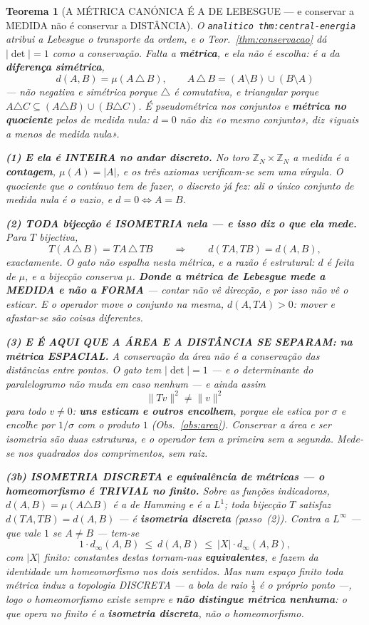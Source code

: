 \documentclass[11pt,a4paper]{article}
\newtheorem{teorema}{Teorema}
\newcommand{\code}[1]{\texttt{\small #1}}
\newcommand{\abs}[1]{\lvert #1\rvert}
\newcommand{\norm}[1]{\lVert #1\rVert}
\begin{document}
\begin{teorema}[A MÉTRICA CANÓNICA É A DE LEBESGUE --- e conservar a MEDIDA não é
conservar a DISTÂNCIA]\label{thm:metrica}
O \code{analitico thm:central-energia} atribui a Lebesgue o \emph{transporte da ordem}, e o
Teor.~\ref{thm:conservacao} dá $\abs{\det}=1$ como a conservação. Falta a \textbf{métrica},
e ela não é escolha: é a da \textbf{diferença simétrica},
\[
\boxed{\;d(A,B)=\mu(A\,\triangle\,B),\qquad A\,\triangle\,B=(A\setminus B)\cup(B\setminus A)\;}
\]
--- não negativa e simétrica porque $\triangle$ é comutativa, e triangular porque
$A\triangle C\subseteq(A\triangle B)\cup(B\triangle C)$. É \emph{pseudo}métrica nos
conjuntos e \textbf{métrica no quociente} pelos de medida nula: $d=0$ não diz «o mesmo
conjunto», diz «iguais a menos de medida nula».

\textbf{(1) E ela é INTEIRA no andar discreto.} No toro $\mathbb{Z}_N\times\mathbb{Z}_N$ a
medida é a \textbf{contagem}, $\mu(A)=\abs{A}$, e os três axiomas verificam-se sem uma
vírgula. \emph{O quociente que o contínuo tem de fazer, o discreto já fez}: ali o único
conjunto de medida nula é o vazio, e $d=0\iff A=B$.

\textbf{(2) TODA bijecção é ISOMETRIA nela --- e isso diz o que ela mede.} Para $T$
bijectiva,
\[
T(A\,\triangle\,B)=TA\,\triangle\,TB \qquad\Longrightarrow\qquad d(TA,TB)=d(A,B),
\]
\emph{exactamente}. O gato não espalha nesta métrica, e a razão é estrutural: $d$ é feita
de $\mu$, e a bijecção conserva $\mu$. \textbf{Donde a métrica de Lebesgue mede a MEDIDA e
não a FORMA} --- contar não vê direcção, e por isso não vê o esticar. E o operador
\emph{move} o conjunto na mesma, $d(A,TA)>0$: \emph{mover e afastar-se são coisas
diferentes}.

\textbf{(3) E É AQUI QUE A ÁREA E A DISTÂNCIA SE SEPARAM: na métrica ESPACIAL.} A
conservação da área não é a conservação das distâncias \emph{entre pontos}. O gato tem
$\abs{\det}=1$ --- e o determinante do paralelogramo não muda em caso nenhum --- e ainda
assim
\[
\norm{Tv}^{2}\neq\norm{v}^{2}
\]
para todo $v\neq0$: \textbf{uns esticam e outros encolhem}, porque ele estica por $\sigma$
e encolhe por $1/\sigma$ com o produto $1$ (Obs.~\ref{obs:area}). \emph{Conservar a área e
ser isometria são duas estruturas, e o operador tem a primeira sem a segunda.} Mede-se nos
quadrados dos comprimentos, sem raiz.

\textbf{(3b) ISOMETRIA DISCRETA e equivalência de métricas --- o homeomorfismo é TRIVIAL
no finito.} Sobre as funções indicadoras, $d(A,B)=\mu(A\triangle B)$ \emph{é} a de
Hamming e \emph{é} a $L^{1}$; toda bijecção $T$ satisfaz $d(TA,TB)=d(A,B)$ --- é
\textbf{isometria discreta} (passo~(2)). Contra a $L^{\infty}$ --- que vale $1$ se
$A\neq B$ --- tem-se
\[
1\cdot d_{\infty}(A,B)\ \leq\ d(A,B)\ \leq\ \abs{X}\cdot d_{\infty}(A,B),
\]
com $\abs{X}$ finito: constantes destas tornam-nas \textbf{equivalentes}, e fazem da
\emph{identidade} um homeomorfismo nos dois sentidos. \emph{Mas num espaço finito toda
métrica induz a topologia DISCRETA} --- a bola de raio $\tfrac12$ é o próprio ponto ---,
logo o homeomorfismo existe sempre e \textbf{não distingue métrica nenhuma}: o que opera
no finito é a \textbf{isometria discreta}, não o homeomorfismo.


\end{teorema}
\end{document}

